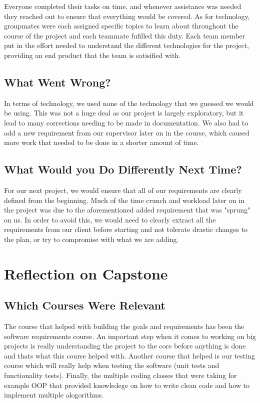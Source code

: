 \documentclass{article}
\begin{document}
Everyone completed their tasks on time, and whenever assistance was needed they reached out to ensure that everything would be covered. As for technology,
groupmates were each assigned specific topics to learn about throughout the course of the project and each teammate fufilled this duty. Each team member put in the
effort needed to understand the different technologies for the project, providing an end product that the team is satisified with.

\subsection{What Went Wrong?}

In terms of technology, we used none of the technology that we guessed we would be using. This was
not a huge deal as our project is largely exploratory, but it lead to many corrections needing to be made in documentation.
We also had to add a new requirement from our supervisor later on in the course, which caused more work that needed to be done in a shorter amount of time. 

\subsection{What Would you Do Differently Next Time?}

For our next project, we would ensure that all of our requirements are clearly defined from the beginning. Much of the time crunch and workload
later on in the project was due to the aforementioned added requirement that was "sprung" on us. In order to avoid this, we would need to clearly extract all the 
requirements from our client before starting and not tolerate drastic changes to the plan, or try to compromise with what we are adding.

\section{Reflection on Capstone}


\subsection{Which Courses Were Relevant}

The course that helped with building the goals and requirements has been the software requirements course. 
An important step when it comes to working on big projects is really understanding the project to the core 
before anything is done and thats what this course helped with. Another course that helped is our testing
course which will really help when testing the software (unit tests and functionality tests). Finally, the 
multiple coding classes that were taking for example OOP that provided knowledege on how to write clean code and 
how to implement multiple alogorithms.
\end{document}
